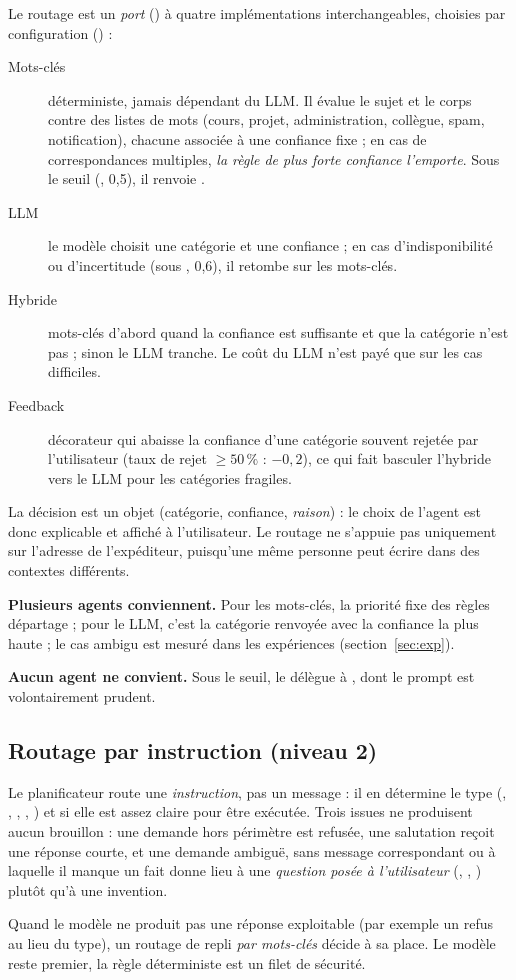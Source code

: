 Le routage est un \emph{port} () à quatre implémentations interchangeables, choisies par configuration () :

\begin{description}
  \item[Mots-clés] déterministe, jamais dépendant du LLM. Il évalue le sujet et le corps contre des listes de mots (cours, projet, administration, collègue, spam, notification), chacune associée à une confiance fixe ; en cas de correspondances multiples, \emph{la règle de plus forte confiance l'emporte}. Sous le seuil (, 0{,}5), il renvoie .
  \item[LLM] le modèle choisit une catégorie et une confiance ; en cas d'indisponibilité ou d'incertitude (sous , 0{,}6), il retombe sur les mots-clés.
  \item[Hybride] mots-clés d'abord quand la confiance est suffisante et que la catégorie n'est pas  ; sinon le LLM tranche. Le coût du LLM n'est payé que sur les cas difficiles.
  \item[Feedback] décorateur qui abaisse la confiance d'une catégorie souvent rejetée par l'utilisateur (taux de rejet $\ge 50\,\%$ : $-0{,}2$), ce qui fait basculer l'hybride vers le LLM pour les catégories fragiles.
\end{description}

La décision est un objet  (catégorie, confiance, \emph{raison}) : le choix de l'agent est donc explicable et affiché à l'utilisateur. Le routage ne s'appuie pas uniquement sur l'adresse de l'expéditeur, puisqu'une même personne peut écrire dans des contextes différents.

\textbf{Plusieurs agents conviennent.} Pour les mots-clés, la priorité fixe des règles départage ; pour le LLM, c'est la catégorie renvoyée avec la confiance la plus haute ; le cas ambigu est mesuré dans les expériences (section~\ref{sec:exp}).

\textbf{Aucun agent ne convient.} Sous le seuil, le  délègue à , dont le prompt est volontairement prudent.

\subsection{Routage par instruction (niveau 2)}

Le planificateur route une \emph{instruction}, pas un message : il en détermine le type (, , , , ) et si elle est assez claire pour être exécutée. Trois issues ne produisent aucun brouillon : une demande hors périmètre est refusée, une salutation reçoit une réponse courte, et une demande ambiguë, sans message correspondant ou à laquelle il manque un fait donne lieu à une \emph{question posée à l'utilisateur} (, , ) plutôt qu'à une invention.

Quand le modèle ne produit pas une réponse exploitable (par exemple un refus au lieu du type), un routage de repli \emph{par mots-clés} décide à sa place. Le modèle reste premier, la règle déterministe est un filet de sécurité.
